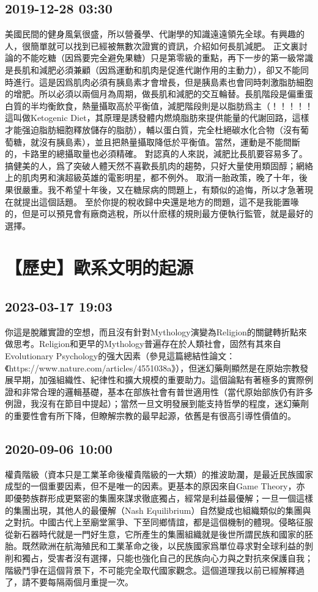 \documentclass[twocolumn]{ctexart}
\begin{document}
\subsection*{2019-12-28 03:30}

美國民間的健身風氣很盛，所以營養學、代謝學的知識遠遠領先全球。有興趣的人，很簡單就可以找到已經被無數次證實的資訊，介紹如何長肌減肥。 
正文裏討論的不能吃糖（因爲要完全避免果糖）只是第零級的重點，再下一步的第一級常識是長肌和減肥必須兼顧（因爲運動和肌肉是促進代謝作用的主動力），卻又不能同時進行。這是因爲肌肉必須有胰島素才會增長，但是胰島素也會同時刺激脂肪細胞的增肥。所以必須以兩個月為周期，做長肌和減肥的交互輪替。長肌階段是偏重蛋白質的半均衡飲食，熱量攝取高於平衡值，減肥階段則是以脂肪爲主（！！！！！這叫做Ketogenic Diet，其原理是誘發體内燃燒脂肪來提供能量的代謝回路，這樣才能强迫脂肪細胞釋放儲存的脂肪），輔以蛋白質，完全杜絕碳水化合物（沒有葡萄糖，就沒有胰島素），並且把熱量攝取降低於平衡值。當然，運動是不能間斷的，卡路里的總攝取量也必須精確。 
對認真的人來説，減肥比長肌要容易多了。搞健美的人，爲了突破人體天然不喜歡長肌肉的趨勢，只好大量使用類固醇；網絡上的肌肉男和演超級英雄的電影明星，都不例外。 
取消一胎政策，晚了十年，後果很嚴重。我不希望十年後，又在糖尿病的問題上，有類似的追悔，所以才急著現在就提出這個話題。 
至於你提的稅收歸中央還是地方的問題，這不是我能置喙的，但是可以預見會有廠商逃稅，所以什麽樣的規則最方便執行監管，就是最好的選擇。
\section*{【歷史】歐系文明的起源}
\subsection*{2023-03-17 19:03}

你這是脫離實證的空想，而且沒有針對Mythology演變為Religion的關鍵轉折點來做思考。Religion和更早的Mythology普遍存在於人類社會，固然有其來自Evolutionary Psychology的强大因素（參見這篇總結性論文：《https://www.nature.com/articles/4551038a》），但迷幻藥劑顯然是在原始宗教發展早期，加强組織性、紀律性和擴大規模的重要助力。這個論點有著極多的實際例證和非常合理的邏輯基礎，基本在部族社會有普世適用性（當代原始部族仍有許多例證，我沒有在節目中提起）；當然一旦文明發展到能支持哲學的程度，迷幻藥劑的重要性會有所下降，但瞭解宗教的最早起源，依舊是有很高引導性價值的。
\subsection*{2020-09-06 10:00}

權貴階級（資本只是工業革命後權貴階級的一大類）的推波助瀾，是最近民族國家成型的一個重要因素，但不是唯一的因素。更基本的原因來自Game Theory，亦即優勢族群形成更緊密的集團來謀求徹底獨占，經常是利益最優解；一旦一個這樣的集團出現，其他人的最優解（Nash Equilibrium）自然變成也組織類似的集團與之對抗。中國古代上至廟堂黨爭、下至同鄉情誼，都是這個機制的體現。侵略征服從新石器時代就是一門好生意，它所產生的集團組織就是後世所謂民族和國家的胚胎。既然歐洲在航海殖民和工業革命之後，以民族國家爲單位尋求對全球利益的剝削和獨占，受害者沒有選擇，只能也強化自己的民族向心力與之對抗來保護自我；階級鬥爭在這個背景下，不可能完全取代國家觀念。這個道理我以前已經解釋過了，請不要每隔兩個月重提一次。
\end{document}
